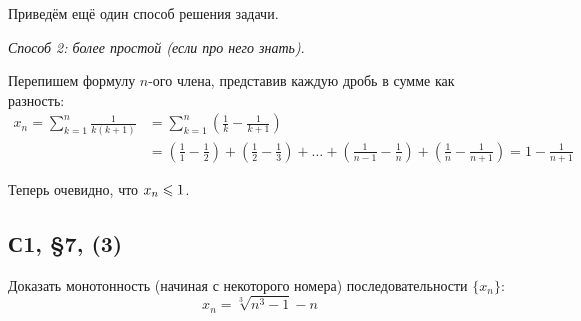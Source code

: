 \documentclass[a4paper,12pt]{article}
\begin{document}
\begin{solution}
    Приведём ещё один способ решения задачи.
    
    \medskip
    
    \emph{Способ 2: более простой (если про него знать)}.
    
    Перепишем формулу $n$-ого члена, представив каждую дробь в сумме как разность:
    \begin{equation*}
    \begin{split}
      x_n = \sum\limits_{k = 1}^n \frac{1}{k(k + 1)}
        &= \sum\limits_{k = 1}^n \left(\frac{1}{k} - \frac{1}{k + 1}\right)\\
        &= \left(\frac{1}{1} - \frac{1}{2}\right) + \left(\frac{1}{2} - \frac{1}{3}\right) + \ldots + \left(\frac{1}{n - 1} - \frac{1}{n}\right) + \left(\frac{1}{n} - \frac{1}{n + 1}\right)
        = 1 - \frac{1}{n + 1}
    \end{split}
    \end{equation*}
    
    Теперь очевидно, что $x_n \hm\leq 1$.
  \end{solution}
  
  
  \subsection{С1, \S 7, (3)}
  
  Доказать монотонность (начиная с некоторого номера) последовательности $\{x_n\}$:
  \[
    x_n = \sqrt[3]{n^3 - 1} - n
  \]
  
\end{document}
